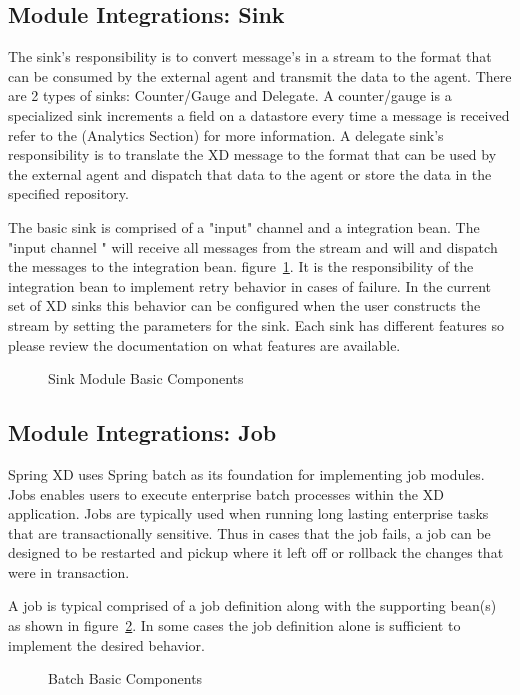 \subsection{Module Integrations: Sink}
The sink's responsibility is to convert message's in a stream to the format that can be 
consumed by the external agent and transmit the data to the agent. 
There are 2 types of sinks: Counter/Gauge and Delegate.  
A counter/gauge is a specialized sink increments a field on a datastore every time a 
message is received refer to the (Analytics Section) for more information.  A delegate 
sink's responsibility is to translate the XD message to the format that can be used by the
 external agent and dispatch that data to the agent or store the data in the specified 
 repository. \par  
 The basic sink is comprised of a "input" channel and a integration bean.
 The "input channel " will receive all messages from the stream and will and dispatch the
 messages to the integration bean. figure~\ref{fig:sinkmbc}. It is the responsibility of 
 the integration bean to implement retry behavior in cases of failure. In the current set 
 of XD sinks this behavior can be configured when the user constructs the stream by setting
 the parameters for the sink.  Each sink has different features so please review the 
 documentation on what features are available.\par
\begin{figure}
\centering
{}
\caption{Sink Module Basic Components}
\label{fig:sinkmbc}
\end{figure}
\subsection{Module Integrations: Job}
Spring XD uses Spring batch \cite{spring-batch-reference} as its foundation for implementing
job modules.  Jobs enables users to execute enterprise batch processes within the XD application. 
Jobs are typically used when running long lasting enterprise tasks that are transactionally 
sensitive.  Thus in cases that the job fails, a job can be designed to be restarted and 
pickup where it left off or rollback the changes that were in transaction.\par
A job is typical comprised of a job definition along with the supporting 
bean(s) as shown in figure~\ref{fig:batchmbc}.
In some cases the job definition alone is sufficient to implement the desired behavior.\par
\begin{figure}
\centering
{}
\caption{Batch Basic Components}
\label{fig:batchmbc}
\end{figure}

